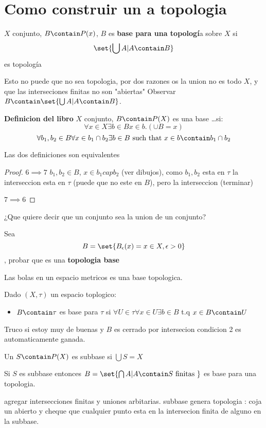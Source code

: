 \section{Como construir un a topologia}
\begin{define}
	$X$ conjunto, $B \contain P(x) $, $B$ es \textbf{base para una topologí}a sobre $X$ si
	\[ \set{\bigcup A | A \contain B} \]
	es topología
\end{define}
Esto no puede que no sea topologia, por dos razones os la union no es todo $X$, y que las interseciones finitas no son "abiertas"
Observar $ B \contain \set{\bigcup A | A \contain B} $.

\begin{define}
	\textbf{Definicion del libro} $X$ conjunto, $ B \contain P(X) $ es una base \ldots si:
	\[ \forall x \in X \exists b \in B x \in b. (\cup B = x) \]
	\[ \forall b_1, b_2 \in B \forall x \in b_1 \cap b_2 \exists b \in B \text{ such that } x \in b \contain b_1 \cap b_2 \]
\end{define}

\begin{thm}
	Las dos definiciones son equivalentes
\end{thm}

\begin{proof}
	$ 6 \implies 7 $  $ b_1, b_2 \in B$, $ x \in b_1 cap b_2$ (ver dibujos), como $ b_1, b_2$ esta en $ \tau$ la interseccion esta en $\tau$ (puede que no este en $B$), pero la interseccion (terminar)   
	
	$ 7 \implies 6 $
\end{proof}
¿Que quiere decir que un conjunto sea la union de un conjunto?

\begin{thm}
	Sea \[B = \set{B_\epsilon(x) = x \in X, \epsilon > 0 } \], probar que es una \textbf{topologia base}
\end{thm}
Las bolas en un espacio metricos es una base topologica.
\begin{define}
	Dado $ (X, \tau) $ un espacio toplogico:
	\begin{itemize}
		\item $B \contain \tau$ es base para $\tau $ si $ \forall U \in \tau \forall x \in U \exists b \in B $ t.q $ x \in B \contain U$
	\end{itemize}
\end{define}
Truco si estoy muy de buenas y $B$ es cerrado por intersecion condicion 2 es automaticamente ganada.
\begin{define}
	Un $S \contain P(X) $ es subbase si $ \bigcup S = X$
\end{define}
\begin{theorem}
	Si $S$ es subbase entonces $B = \set{ \bigcap A | A \contain S \text{ finitas }} $ es base para una topologia.
\end{theorem}
agregar intersecciones finitas y uniones arbitarias.
subbase genera topologia : coja un abierto y cheque que cualquier punto esta en la intersecion finita de alguno en la subbase.